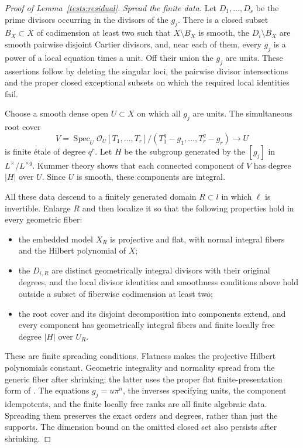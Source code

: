 \begin{proof}[Proof of Lemma~\ref{tests:residual}]
\emph{Spread the finite data.}
Let $D_1,\ldots,D_s$ be the prime divisors occurring in the divisors of
the $g_j$.  There is a closed subset $B_X\subset X$ of codimension at
least two such that $X\setminus B_X$ is smooth, the
$D_i\setminus B_X$ are smooth pairwise disjoint Cartier divisors, and,
near each of them, every $g_j$ is a power of a local equation times a
unit.  Off their union the $g_j$ are units.
These assertions follow by deleting the singular loci, the pairwise
divisor intersections and the proper closed exceptional subsets on
which the required local identities fail.

Choose a smooth dense open $U\subset X$ on which all $g_j$ are units.
The simultaneous root cover
\[
 V=\operatorname{Spec}_U
 \mathcal O_U[T_1,\ldots,T_r]/(T_1^q-g_1,\ldots,T_r^q-g_r)
 \longrightarrow U
\]
is finite \'etale of degree $q^r$.
Let $H$ be the subgroup generated by the $[g_j]$ in
$L^\times/L^{\times q}$.  Kummer theory shows that each connected
component of $V$ has degree $|H|$ over $U$.
Since $U$ is smooth, these components are integral.

All these data descend to a finitely generated domain $R\subset l$ in
which $\ell$ is invertible.  Enlarge $R$ and then localize it so that the
following properties hold in every geometric fiber:
\begin{itemize}
\item the embedded model $X_R$ is projective and flat, with normal
      integral fibers and the Hilbert polynomial of $X$;
\item the $D_{i,R}$ are distinct geometrically integral divisors with
      their original degrees, and the local divisor identities and
      smoothness conditions above hold outside a subset of fiberwise
      codimension at least two;
\item the root cover and its disjoint decomposition into components
      extend, and every component has geometrically integral fibers
      and finite locally free degree $|H|$ over $U_R$.
\end{itemize}
These are finite spreading conditions.  Flatness makes the projective
Hilbert polynomials constant.  Geometric integrality and normality
spread from the generic fiber after shrinking; the latter uses the
proper flat finite-presentation form of
\cite[Theorem~12.2.4(iv),(viii)]{EGAIV3}.
The equations $g_j=u\pi^n$, the inverses specifying units, the component
idempotents, and the finite locally free ranks are all finite algebraic
data.  Spreading them preserves the exact orders and degrees, rather
than just the supports.  The dimension bound on the omitted closed set
also persists after shrinking.


\end{proof}
